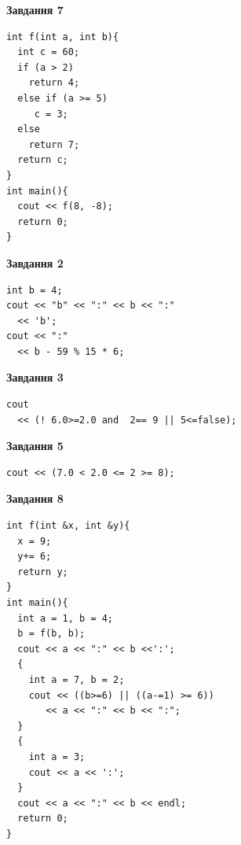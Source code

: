 \documentclass[12pt, ukrainian]{article}
\begin{document}
{\begin {large}
\begin{minipage}[t]{7.0cm}
\begin{center}
\textbf{Завдання 7}
\end{center}
\vspace{-8mm}

\begin{verbatim}
int f(int a, int b){
  int c = 60;
  if (a > 2)
    return 4;
  else if (a >= 5)
     c = 3;
  else
    return 7;
  return c;
}
int main(){
  cout << f(8, -8);
  return 0;
}
\end{verbatim}

\end{minipage}
\vline \hspace{1mm}
\begin{minipage}[t]{11.0cm}

\begin{center}
\textbf{Завдання 2}
\end{center}
\vspace{-8mm}

\begin{verbatim}
int b = 4;
cout << "b" << ":" << b << ":" 
  << 'b';
cout << ":" 
  << b - 59 % 15 * 6;
\end{verbatim}



\begin{center}
\textbf{Завдання 3}
\end{center}
\vspace{-8mm}

\begin{verbatim}
cout 
  << (! 6.0>=2.0 and  2== 9 || 5<=false);
\end{verbatim}



\begin{center}
\textbf{Завдання 5}
\end{center}
\vspace{-8mm}

\begin{verbatim}
cout << (7.0 < 2.0 <= 2 >= 8);
\end{verbatim}



\begin{center}
\textbf{Завдання 8}
\end{center}
\vspace{-8mm}

\begin{verbatim}
int f(int &x, int &y){
  x = 9;
  y+= 6;
  return y;
}
int main(){
  int a = 1, b = 4;
  b = f(b, b);
  cout << a << ":" << b <<':';
  {
    int a = 7, b = 2;
    cout << ((b>=6) || ((a-=1) >= 6))
       << a << ":" << b << ":";
  }
  {
    int a = 3;
    cout << a << ':';
  }
  cout << a << ":" << b << endl;
  return 0;
}
\end{verbatim}


\end{minipage}
\end{large}}
\end{document}
